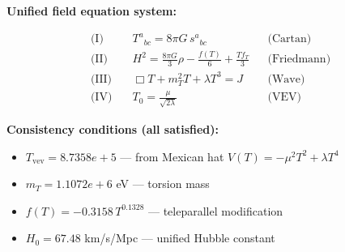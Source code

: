 
\textbf{Unified field equation system:}

\begin{align}
  \text{(I)} \quad & T^a{}_{bc} = 8\pi G \, s^a{}_{bc} && \text{(Cartan)} \\
  \text{(II)} \quad & H^2 = \frac{8\pi G}{3}\rho - \frac{f(T)}{6} + \frac{Tf_T}{3} && \text{(Friedmann)} \\
  \text{(III)} \quad & \Box T + m_T^2 T + \lambda T^3 = J && \text{(Wave)} \\
  \text{(IV)} \quad & T_0 = \frac{\mu}{\sqrt{2\lambda}} && \text{(VEV)}
\end{align}

\textbf{Consistency conditions (all satisfied):}
\begin{itemize}
  \item $T_{\text{vev}} = 8.7358e+5$ — from Mexican hat $V(T) = -\mu^2 T^2 + \lambda T^4$
  \item $m_T = 1.1072e+6$ eV — torsion mass
  \item $f(T) = -0.3158 \, T^{0.1328}$ — teleparallel modification
  \item $H_0 = 67.48$ km/s/Mpc — unified Hubble constant
\end{itemize}